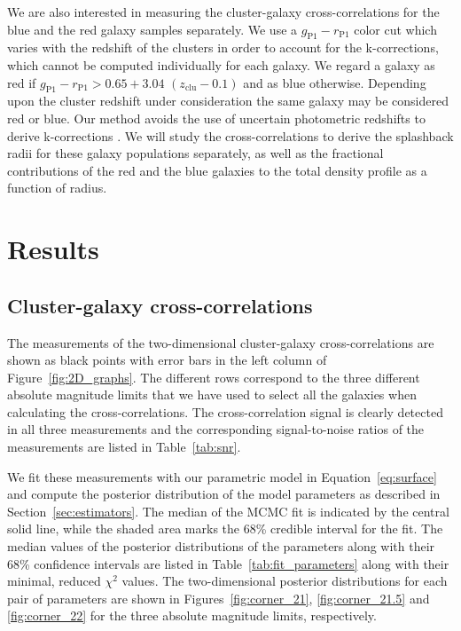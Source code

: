 \documentclass[iop, apjl, twocolappendix, numberedappendix]{emulateapj}
\begin{document}
We are also interested in measuring the cluster-galaxy
cross-correlations for the blue and the red galaxy samples
separately. We use a $g_{\mathrm{P1}}-r_{\mathrm{P1}}$ color cut
which varies with the redshift of the clusters in order to account
for the k-corrections, which cannot be computed individually for
each galaxy. We regard a galaxy as red if
$g_{\mathrm{P1}}-r_{\mathrm{P1}} > 0.65 + 3.04$ $(z_{\mathrm{clu}} -
0.1)$ and as blue otherwise. Depending upon the cluster redshift
under consideration the same galaxy may be considered red or blue. Our
method avoids the use of uncertain photometric redshifts to derive
k-corrections \citep[cf.][]{baxter2017halo}. We will study the
cross-correlations to derive the splashback radii for these galaxy
populations separately, as well as the fractional
contributions of the red and the blue galaxies to the total density profile
as a function of radius.


\section{Results}
\label{sec:Results}
\subsection{Cluster-galaxy cross-correlations}
The measurements of the two-dimensional cluster-galaxy
cross-correlations are shown as black points with error bars in the
left column of Figure~\ref{fig:2D_graphs}. The different rows
correspond to the three different absolute magnitude limits that we
have used to select all the galaxies when calculating the
cross-correlations. The cross-correlation signal is clearly detected
in all three measurements and the corresponding signal-to-noise
ratios of the measurements are listed in Table~\ref{tab:snr}.

We fit these measurements with our parametric model in Equation~\ref{eq:surface}
and compute the posterior distribution of the model parameters 
as described in Section~\ref{sec:estimators}. The
median of the MCMC fit is indicated by the central solid line, while
the shaded area marks the 68\% credible interval for the fit. The
median values of the posterior distributions of the parameters along
with their 68\% confidence intervals are listed in
Table~\ref{tab:fit_parameters} along with their minimal, reduced
$\chi^2$ values. The two-dimensional posterior distributions for
each pair of parameters are shown in Figures~\ref{fig:corner_21},
\ref{fig:corner_21.5} and \ref{fig:corner_22} for the three absolute
magnitude limits, respectively.
\end{document}
